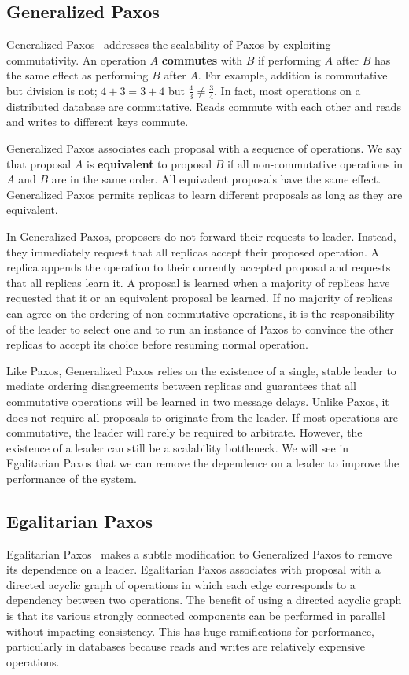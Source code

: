 \documentclass[../main.tex]{subfiles}
\begin{document}
  \subsection{Generalized Paxos}
  Generalized Paxos~\cite{generalized-paxos} addresses the scalability of Paxos by exploiting
  commutativity. An operation $A$ \textbf{commutes} with $B$ if performing $A$ after $B$ has the
  same effect as performing $B$ after $A$. For example, addition is commutative but division is not;
  $4 + 3 = 3 + 4$ but $\frac{4}{3} \ne \frac{3}{4}$. In fact, most operations on a distributed
  database are commutative. Reads commute with each other and reads and writes to different keys
  commute.

  Generalized Paxos associates each proposal with a sequence of operations. We say that proposal $A$
  is \textbf{equivalent} to proposal $B$ if all non-commutative operations in $A$ and $B$ are in the
  same order. All equivalent proposals have the same effect. Generalized Paxos permits replicas to
  learn different proposals as long as they are equivalent.

  In Generalized Paxos, proposers do not forward their requests to leader. Instead, they immediately
  request that all replicas accept their proposed operation. A replica appends the operation to
  their currently accepted proposal and requests that all replicas learn it. A proposal is learned
  when a majority of replicas have requested that it or an equivalent proposal be learned.
  If no majority of replicas can agree on the ordering of non-commutative operations, it is the
  responsibility of the leader to select one and to run an instance of Paxos to convince the other
  replicas to accept its choice before resuming normal operation.

  Like Paxos, Generalized Paxos relies on the existence of a single, stable leader to mediate
  ordering disagreements between replicas and guarantees that all commutative operations will be
  learned in two message delays. Unlike Paxos, it does not require all proposals to originate from
  the leader. If most operations are commutative, the leader will rarely be required to arbitrate.
  However, the existence of a leader can still be a scalability bottleneck. We will see in
  Egalitarian Paxos that we can remove the dependence on a leader to improve the performance of the
  system.

  \subsection{Egalitarian Paxos}
  Egalitarian Paxos~\cite{epaxos} makes a subtle modification to Generalized Paxos to remove its
  dependence on a leader. Egalitarian Paxos associates with proposal with a directed acyclic graph
  of operations in which each edge corresponds to a dependency between two operations. The benefit
  of using a directed acyclic graph is that its various strongly connected components can be
  performed in parallel without impacting consistency. This has huge ramifications for performance,
  particularly in databases because reads and writes are relatively expensive operations.
\end{document}
